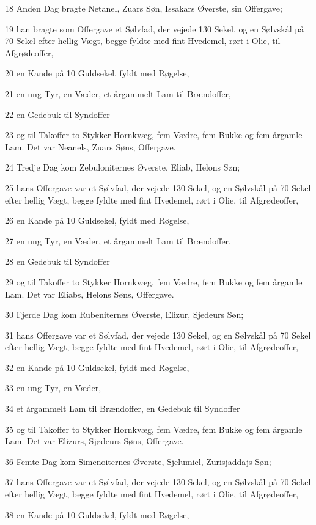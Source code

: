 \par 18 Anden Dag bragte Netanel, Zuars Søn, Issakars Øverste, sin Offergave;
\par 19 han bragte som Offergave et Sølvfad, der vejede 130 Sekel, og en Sølvskål på 70 Sekel efter hellig Vægt, begge fyldte med fint Hvedemel, rørt i Olie, til Afgrødeoffer,
\par 20 en Kande på 10 Guldsekel, fyldt med Røgelse,
\par 21 en ung Tyr, en Væder, et årgammelt Lam til Brændoffer,
\par 22 en Gedebuk til Syndoffer
\par 23 og til Takoffer to Stykker Hornkvæg, fem Vædre, fem Bukke og fem årgamle Lam. Det var Neanels, Zuars Søns, Offergave.
\par 24 Tredje Dag kom Zebuloniternes Øverste, Eliab, Helons Søn;
\par 25 hans Offergave var et Sølvfad, der vejede 130 Sekel, og en Sølvskål på 70 Sekel efter hellig Vægt, begge fyldte med fint Hvedemel, rørt i Olie, til Afgrødeoffer,
\par 26 en Kande på 10 Guldsekel, fyldt med Røgelse,
\par 27 en ung Tyr, en Væder, et årgammelt Lam til Brændoffer,
\par 28 en Gedebuk til Syndoffer
\par 29 og til Takoffer to Stykker Hornkvæg, fem Vædre, fem Bukke og fem årgamle Lam. Det var Eliabs, Helons Søns, Offergave.
\par 30 Fjerde Dag kom Rubeniternes Øverste, Elizur, Sjedeurs Søn;
\par 31 hans Offergave var et Sølvfad, der vejede 130 Sekel, og en Sølvskål på 70 Sekel efter hellig Vægt, begge fyldte med fint Hvedemel, rørt i Olie, til Afgrødeoffer,
\par 32 en Kande på 10 Guldsekel, fyldt med Røgelse,
\par 33 en ung Tyr, en Væder,
\par 34 et årgammelt Lam til Brændoffer, en Gedebuk til Syndoffer
\par 35 og til Takoffer to Stykker Hornkvæg, fem Vædre, fem Bukke og fem årgamle Lam. Det var Elizurs, Sjødeurs Søns, Offergave.
\par 36 Femte Dag kom Simenoiternes Øverste, Sjelumiel, Zurisjaddajs Søn;
\par 37 hans Offergave var et Sølvfad, der vejede 130 Sekel, og en Sølvskål på 70 Sekel efter hellig Vægt, begge fyldte med fint Hvedemel, rørt i Olie, til Afgrødeoffer,
\par 38 en Kande på 10 Guldsekel, fyldt med Røgelse,
